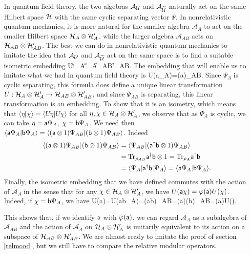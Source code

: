 \documentclass[12pt]{article}
\def\Tr{{\rm Tr}}
\def\a{{\sf a}}
\def\b{{\sf b}}
\def\ra{\rangle}
\def\la{\langle}
\numberwithin{equation}{section}
\def\A{{\mathcal A}}
\begin{document}
In quantum field theory, the two algebras $\A_\U$ and $\A_{\t\U}$ naturally act on the same Hilbert space ${\mathcal H}$ with the
same cyclic separating vector $\Psi$. In nonrelativistic
quantum mechanics, it is more natural for the smaller algebra $\A_A$ to act on the smaller Hilbert space ${\mathcal H}_A\otimes {\mathcal H}'_A$,
while the larger algebra $\A_{AB}$ acts on ${\mathcal H}_{AB}\otimes {\mathcal H}'_{AB}$.    The best we can do in nonrelativistic quantum mechanics
to imitate the idea that $\A_\U$ and $\A_{\t\U}$ act on the same space is to find a suitable isometric  embedding 
\be\label{uemb}U:\H_A\otimes \H'_A\to \H_{AB}\otimes \H'_{AB}. \ee
The embedding that will enable us to imitate what we had in quantum field theory is
\be\label{zemb} U(\a\Psi_{A})=(\a{})\Psi_{AB}. \ee
Since $\Psi_A$ is cyclic separating, this formula does define a unique linear transformation  
$U:{\mathcal H}_A\otimes {\mathcal H}'_A\to {\mathcal H}_{AB}\otimes {\mathcal H}'_{AB}$,
and since $\Psi_{AB}$ is separating, this linear transformation is an embedding.
To show that it is an isometry, which means that $\la\eta|\chi\ra=\la U\eta|U\chi\ra$ for all $\eta,\chi\in {\mathcal H}_A\otimes {\mathcal H}'_A$,
we observe that as $\Psi_A$ is cyclic, we can take $\eta=\a\Psi_A$, $\chi=\b\Psi_A$.  We need then
$\la \a\Psi_A|\b\Psi_A\ra = \la (\a\otimes 1)\Psi_{AB}|(\b\otimes 1)\Psi_{AB}\ra$.  Indeed
\begin{align}
\begin{split}
\label{remb}\la (\a\otimes 1)\Psi_{AB}|(\b\otimes 1)\Psi_{AB}\ra &=\la\Psi_{AB}|(\a^\dagger \b\otimes 1) \Psi_{AB}\ra \\
&=\Tr_{\rho_{AB}} \a^\dagger \b\otimes 1=\Tr_{\rho_A} \a^\dagger \b \\
& =\la\Psi_A|\a^\dagger \b|\Psi_A\ra = \la
\a\Psi_A|\b\Psi_A\ra. \end{split}\end{align}
Finally, the isometric embedding that we have defined commutes with the action of $\A_A$ in the sense that for
any $\chi\in {\mathcal H}_A\otimes {\mathcal H}'_A$, we have $U(\a\chi)=\varphi(\a)U(\chi)$.  Indeed, if $\chi=\b\Psi_A$, we have 
\be\label{mirz} U(\a\chi)=U(\a\b\Psi_A)=(\a\b{})\Psi_{AB}=(\a{})(\b{})\Psi_{AB}=\varphi(\a)U(\chi). \ee

This shows that, if we identify $\a$ with $\varphi(\a)$, we can regard $\A_A$ as a subalgebra of $\A_{AB}$ and the action of 
$\A_A$ on ${\mathcal H}_A\otimes {\mathcal H}'_A$ is unitarily equivalent to its action on a subspace of ${\mathcal H}_{AB}\otimes {\mathcal H}_{AB}'$.
  We are almost ready to imitate the proof of section \ref{relmood}, but
we still have to compare the relative modular operators.
\end{document}

